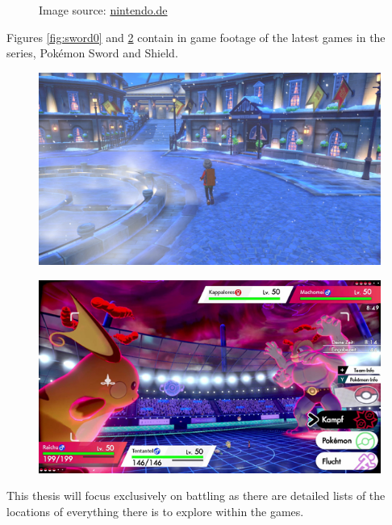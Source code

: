 \documentclass{article}
\begin{document}
\begin{figure}[ht]
\begin{minipage}{.5\textwidth}
      \label{fig:red1}
    \end{minipage}
    \caption*{Image source: \href{https://www.nintendo.de/Spiele/Game-Boy/Pokemon-Rote-Edition-266109.html}{nintendo.de}}
\end{figure}
Figures \ref{fig:sword0} and \ref{fig:sword1} contain in game footage of the latest games in
the series, Pokémon Sword and Shield.
\begin{figure}
  \centering
  \begin{minipage}{.48\textwidth}
    \centering
    \includegraphics[width=.9\linewidth]{images/Sword-0.jpg}
    \label{fig:sword0}
  \end{minipage}%
  \begin{minipage}{.48\textwidth}
    \centering
    \includegraphics[width=.9\linewidth]{images/Sword-1.jpg}
    \label{fig:sword1}
  \end{minipage}
\end{figure}
This thesis will focus exclusively on battling as there are detailed lists
of the locations of everything there is to explore within the games.
\end{document}
